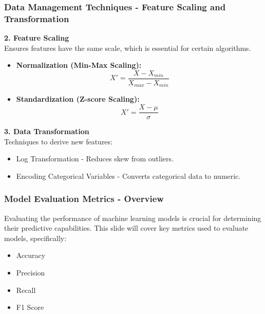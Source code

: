 \documentclass{beamer}
\begin{document}
\begin{frame}[fragile]
    \frametitle{Data Management Techniques - Feature Scaling and Transformation}

    \textbf{2. Feature Scaling}\\
    Ensures features have the same scale, which is essential for certain algorithms.
    \begin{itemize}
        \item \textbf{Normalization (Min-Max Scaling):}\\
        \begin{equation}
            X' = \frac{X - X_{min}}{X_{max} - X_{min}}
        \end{equation}
        
        \item \textbf{Standardization (Z-score Scaling):}\\
        \begin{equation}
            X' = \frac{X - \mu}{\sigma}
        \end{equation}
    \end{itemize}

    \textbf{3. Data Transformation}\\
    Techniques to derive new features:
    \begin{itemize}
        \item Log Transformation - Reduces skew from outliers.
        \item Encoding Categorical Variables - Converts categorical data to numeric.
    \end{itemize}
\end{frame}

\begin{frame}[fragile]
    \frametitle{Model Evaluation Metrics - Overview}
    Evaluating the performance of machine learning models is crucial for determining their predictive capabilities. 
    This slide will cover key metrics used to evaluate models, specifically: 
    \begin{itemize}
        \item Accuracy
        \item Precision
        \item Recall
        \item F1 Score
    \end{itemize}
\end{frame}
\end{document}

